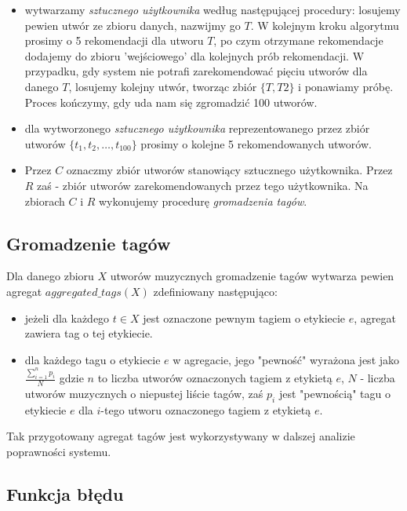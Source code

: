 \documentclass[a4paper,10pt]{article}
\begin{document}
\begin{itemize}
 \item wytwarzamy \textit{sztucznego użytkownika} według następującej procedury: losujemy pewien utwór ze zbioru danych, nazwijmy go $T$. W kolejnym kroku algorytmu prosimy o 5 rekomendacji dla utworu $T$, po czym otrzymane rekomendacje dodajemy do zbioru 'wejściowego' dla kolejnych prób rekomendacji. W przypadku, gdy system nie potrafi zarekomendować pięciu utworów dla danego $T$, losujemy kolejny utwór, tworząc zbiór $\{T, T2\}$ i ponawiamy próbę. Proces kończymy, gdy uda nam się zgromadzić 100 utworów.
 \item dla wytworzonego \textit{sztucznego użytkownika} reprezentowanego przez zbiór utworów $\{ t_{1}, t_{2}, \dots, t_{100} \}$ prosimy o kolejne 5 rekomendowanych utworów.
 \item Przez $C$ oznaczmy zbiór utworów stanowiący sztucznego użytkownika. Przez $R$ zaś - zbiór utworów zarekomendowanych przez tego użytkownika. Na zbiorach $C$ i $R$ wykonujemy procedurę \textit{gromadzenia tagów}.
\end{itemize}

\subsection{Gromadzenie tagów}

Dla danego zbioru $X$ utworów muzycznych gromadzenie tagów wytwarza pewien agregat $aggregated\_tags\left(X\right)$ zdefiniowany następująco:

\begin{itemize}
 \item jeżeli dla każdego $t \in X$ jest oznaczone pewnym tagiem o etykiecie $e$, agregat zawiera tag o tej etykiecie.
 \item dla każdego tagu o etykiecie $e$ w agregacie, jego "pewność" wyrażona jest jako $\frac{\sum^{n}_{i=1} p_{i}}{N}$ gdzie $n$ to liczba utworów oznaczonych tagiem z etykietą $e$, $N$ - liczba utworów muzycznych o niepustej liście tagów, zaś $p_{i}$ jest "pewnością" tagu o etykiecie $e$ dla $i$-tego utworu oznaczonego tagiem z etykietą $e$.
\end{itemize}

Tak przygotowany agregat tagów jest wykorzystywany w dalszej analizie poprawności systemu.

\subsection{Funkcja błędu}
\end{document}

